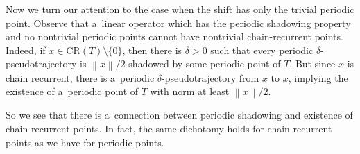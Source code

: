 \documentclass[11pt,a4paper]{amsart}
\theoremstyle{definition}
\newcommand{\norm}[1]{\left\| #1 \right\|}
\newcommand{\CR}{\mathrm{CR}}
\begin{document}
	Now we turn our attention to the case when the shift has only the trivial periodic point. Observe that a~linear operator which has the periodic shadowing property and no nontrivial periodic points cannot have nontrivial chain-recurrent points. Indeed, if $x \in \CR(T) \setminus \{0\}$, then there is $\delta > 0$ such that every periodic $\delta$-pseudotrajectory is $\norm{x}/2$-shadowed by some periodic point of $T$. But since $x$ is chain recurrent, there is a~periodic $\delta$-pseudotrajectory from $x$ to $x$, implying the existence of a~periodic point of $T$ with norm at least $\norm{x}/2$.
	
	So we see that there is a~connection between periodic shadowing and existence of chain-recurrent points. In fact, the same dichotomy holds for chain recurrent points as we have for periodic points.
	
\end{document}
